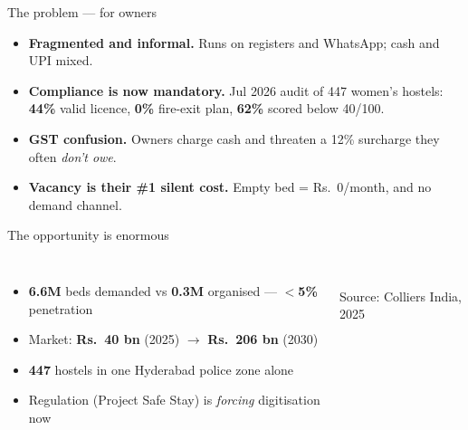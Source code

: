 \documentclass[aspectratio=169]{beamer}
\begin{document}
\begin{frame}{The problem — for owners}
  \begin{itemize}
    \item \textbf{Fragmented and informal.} Runs on registers and WhatsApp; cash and UPI mixed.
    \item \textbf{Compliance is now mandatory.} Jul 2026 audit of 447 women's hostels:
      \textbf{44\%} valid licence, \textbf{0\%} fire-exit plan, \textbf{62\%} scored below 40/100.
    \item \textbf{GST confusion.} Owners charge cash and threaten a 12\% surcharge they often \emph{don't owe}.
    \item \textbf{Vacancy is their \#1 silent cost.} Empty bed = Rs.\ 0/month, and no demand channel.
  \end{itemize}
\end{frame}

\begin{frame}{The opportunity is enormous}
  \begin{columns}
      \begin{itemize}
        \item \textbf{6.6M} beds demanded vs \textbf{0.3M} organised — \textbf{$<$5\%} penetration
        \item Market: \textbf{Rs.\ 40 bn} (2025) $\rightarrow$ \textbf{Rs.\ 206 bn} (2030)
        \item \textbf{447} hostels in one Hyderabad police zone alone
        \item Regulation (Project Safe Stay) is \emph{forcing} digitisation now
      \end{itemize}
      \begin{center}
        \\[0.2cm]
        {\small Source: Colliers India, 2025}
      \end{center}
  \end{columns}
\end{frame}
\end{document}
